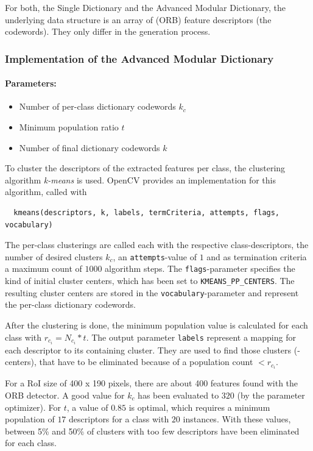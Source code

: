 For both, the Single Dictionary and the Advanced Modular Dictionary, the underlying data structure is an array of (ORB) feature descriptors (the codewords). They only differ in the generation process.

\subsubsection{Implementation of the Advanced Modular Dictionary}
\paragraph{Parameters:}
\begin{itemize}
  \item Number of per-class dictionary codewords $k_c$
  \item Minimum population ratio $t$
  \item Number of final dictionary codewords $k$
\end{itemize}
To cluster the descriptors of the extracted features per class, the clustering algorithm \emph{k-means} is used. OpenCV provides an implementation for this algorithm, called with
\begin{verbatim}
  kmeans(descriptors, k, labels, termCriteria, attempts, flags, vocabulary)
\end{verbatim}
The per-class clusterings are called each with the respective class-descriptors, the number of desired clusters $k_c$, an \texttt{attempts}-value of $1$ and as termination criteria a maximum count of $1000$ algorithm steps. The \texttt{flags}-parameter specifies the kind of initial cluster centers, which has been set to \texttt{KMEANS\_PP\_CENTERS}. The resulting cluster centers are stored in the \texttt{vocabulary}-parameter and represent the per-class dictionary codewords.

After the clustering is done, the minimum population value is calculated for each class with $r_{c_i} = N_{c_i} * t$. The output parameter \texttt{labels} represent a mapping for each descriptor to its containing cluster. They are used to find those clusters (-centers), that have to be eliminated because of a population count $< r_{c_i}$.

For a RoI size of 400 x 190 pixels, there are about 400 features found with the ORB detector. A good value for $k_c$ has been evaluated to $320$ (by the parameter optimizer). For $t$, a value of $0.85$ is optimal, which requires a minimum population of $17$ descriptors for a class with $20$ instances. With these values, between 5\% and 50\% of clusters with too few descriptors have been eliminated for each class.

